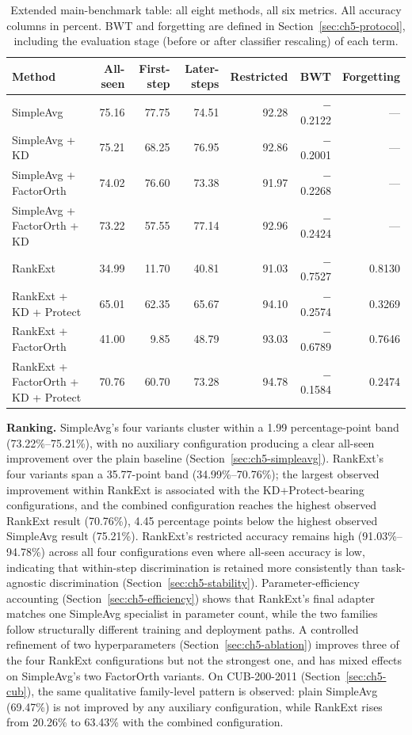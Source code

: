 \begin{table}[htbp]
\centering
\begin{tabularx}{\textwidth}{@{}X r r r r r r@{}}
\toprule
\textbf{Method} & \textbf{All-seen} & \textbf{First-step} & \textbf{Later-steps} & \textbf{Restricted} & \textbf{BWT} & \textbf{Forgetting} \\
\midrule
SimpleAvg & 75.16 & 77.75 & 74.51 & 92.28 & $-$0.2122 & --- \\
SimpleAvg + KD & 75.21 & 68.25 & 76.95 & 92.86 & $-$0.2001 & --- \\
SimpleAvg + FactorOrth & 74.02 & 76.60 & 73.38 & 91.97 & $-$0.2268 & --- \\
SimpleAvg + FactorOrth + KD & 73.22 & 57.55 & 77.14 & 92.96 & $-$0.2424 & --- \\
RankExt & 34.99 & 11.70 & 40.81 & 91.03 & $-$0.7527 & 0.8130 \\
RankExt + KD + Protect & 65.01 & 62.35 & 65.67 & 94.10 & $-$0.2574 & 0.3269 \\
RankExt + FactorOrth & 41.00 & 9.85 & 48.79 & 93.03 & $-$0.6789 & 0.7646 \\
RankExt + FactorOrth + KD + Protect & 70.76 & 60.70 & 73.28 & 94.78 & $-$0.1584 & 0.2474 \\
\bottomrule
\end{tabularx}
\caption[Extended main benchmark table]{Extended main-benchmark table: all
eight methods, all six metrics. All accuracy columns in percent. BWT and
forgetting are defined in Section~\ref{sec:ch5-protocol}, including the
evaluation stage (before or after classifier rescaling) of each term.}
\label{tab:ch5-main-extended}
\end{table}

\textbf{Ranking.} SimpleAvg's four variants cluster
within a 1.99 percentage-point band (73.22\%--75.21\%), with no auxiliary
configuration producing a clear all-seen improvement over the plain baseline
(Section~\ref{sec:ch5-simpleavg}). RankExt's four variants span a
35.77-point band (34.99\%--70.76\%); the largest observed improvement within
RankExt is associated with the KD+Protect-bearing configurations, and the
combined configuration reaches the highest observed RankExt result
(70.76\%), 4.45 percentage points below the highest observed SimpleAvg
result (75.21\%). RankExt's restricted accuracy remains high
(91.03\%--94.78\%) across all four configurations even where all-seen
accuracy is low, indicating that within-step discrimination is retained
more consistently than task-agnostic discrimination
(Section~\ref{sec:ch5-stability}). Parameter-efficiency accounting
(Section~\ref{sec:ch5-efficiency}) shows that RankExt's final adapter
matches one SimpleAvg specialist in parameter count, while the two families
follow structurally different training and deployment paths. A controlled refinement of two hyperparameters
(Section~\ref{sec:ch5-ablation}) improves three of the four RankExt
configurations but not the strongest one, and has mixed effects on
SimpleAvg's two FactorOrth variants. On CUB-200-2011
(Section~\ref{sec:ch5-cub}), the same qualitative family-level pattern is
observed: plain SimpleAvg (69.47\%) is not improved by any auxiliary
configuration, while RankExt rises from 20.26\% to 63.43\% with the
combined configuration.


